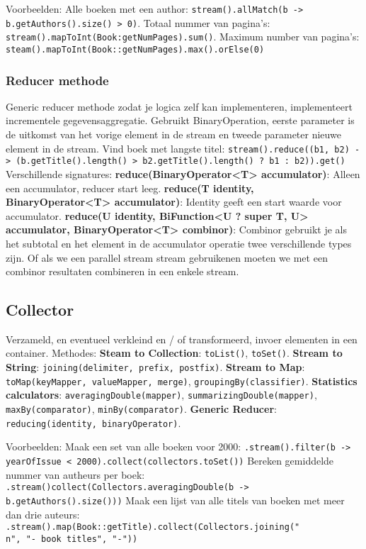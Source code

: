 Voorbeelden: 
Alle boeken met een author: \texttt{stream().allMatch(b -> b.getAuthors().size() > 0)}.
Totaal nummer van pagina's: \texttt{stream().mapToInt(Book:getNumPages).sum()}.
Maximum number van pagina's: \texttt{steam().mapToInt(Book::getNumPages).max().orElse(0)}

\subsubsection{Reducer methode}
Generic reducer methode zodat je logica zelf kan implementeren, implementeert incrementele gegevensaggregatie.
Gebruikt BinaryOperation, eerste parameter is de uitkomst van het vorige element in de stream en tweede parameter nieuwe element in de stream.
Vind boek met langste titel: \texttt{stream().reduce((b1, b2) -> (b.getTitle().length() > b2.getTitle().length() ? b1 : b2)).get()}
Verschillende signatures:
\textbf{reduce(BinaryOperator<T> accumulator)}: Alleen een accumulator, reducer start leeg.
\textbf{reduce(T identity, BinaryOperator<T> accumulator)}: Identity geeft een start waarde voor accumulator.
\textbf{reduce(U identity, BiFunction<U ? super T, U> accumulator, BinaryOperator<T> combinor)}:
Combinor gebruikt je als het subtotal en het element in de accumulator operatie twee verschillende types zijn.
Of als we een parallel stream stream gebruikenen moeten we met een combinor resultaten combineren in een enkele stream.

\subsection{Collector}
Verzameld, en eventueel verkleind en / of transformeerd, invoer elementen in een container.
Methodes:
\textbf{Steam to Collection}: \texttt{toList()}, \texttt{toSet()}.
\textbf{Stream to String}: \texttt{joining(delimiter, prefix, postfix)}.
\textbf{Stream to Map}: \texttt{toMap(keyMapper, valueMapper, merge)}, \texttt{groupingBy(classifier)}.
\textbf{Statistics calculators}: \texttt{averagingDouble(mapper)}, \texttt{summarizingDouble(mapper)}, \texttt{maxBy(comparator)}, \texttt{minBy(comparator)}.
\textbf{Generic Reducer}: \texttt{reducing(identity, binaryOperator)}.

Voorbeelden:
Maak een set van alle boeken voor 2000:
\texttt{.stream().filter(b -> yearOfIssue < 2000).collect(collectors.toSet())}
Bereken gemiddelde nummer van autheurs per boek:
\texttt{.stream()collect(Collectors.averagingDouble(b -> b.getAuthors().size()))}
Maak een lijst van alle titels van boeken met meer dan drie auteurs:
\texttt{.stream().map(Book::getTitle).collect(Collectors.joining("\\n", "- book titles", "-"))}

